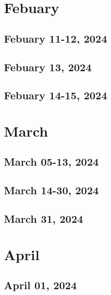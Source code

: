 \chapter{Febuary}
\section{Febuary 11-12, 2024}

\section{Febuary 13, 2024}

\section{Febuary 14-15, 2024}


\chapter{March}
\section{March 05-13, 2024}

\section{March 14-30, 2024}

\section{March 31, 2024}


\chapter{April}
\section{April 01, 2024}

